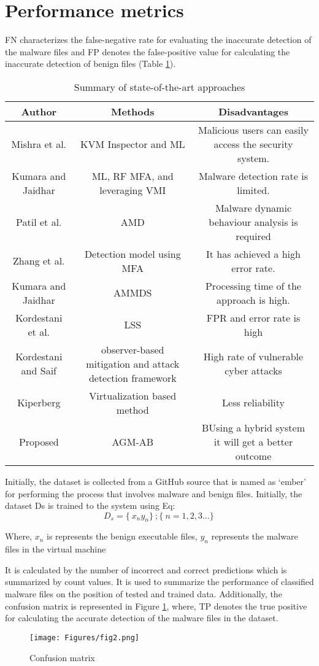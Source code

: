 \documentclass[acmtog]{acmart}
\begin{document}
\section {Performance metrics}
FN characterizes the false-negative rate for evaluating the inaccurate detection of the malware files and FP denotes the false-positive value for calculating the inaccurate detection of benign files (Table \ref{tab:freq1}).
\begin{table}
  \caption{Summary of state-of-the-art approaches}
  \label{tab:freq1}
  \begin{tabular}{ccc}
    \toprule
    Author&Methods&Disadvantages\\
    \midrule
        Mishra et al.&KVM Inspector and ML&Malicious users can easily access the security system.\\
    \midrule
        Kumara and Jaidhar&ML, RF MFA, and leveraging VMI&Malware detection rate is limited.\\
    \midrule
        Patil et al.&AMD&Malware dynamic behaviour analysis is required\\
    \midrule
        Zhang et al.&Detection model using MFA&It has achieved a high error rate.\\
    \midrule
        Kumara and Jaidhar&AMMDS&Processing time of the approach is high.\\
    \midrule
        Kordestani et al.&LSS&FPR and error rate is high\\
    \midrule
        Kordestani and Saif&observer-based mitigation and attack detection framework&High rate of vulnerable cyber attacks\\
    \midrule
        Kiperberg&Virtualization based method&Less reliability\\
    \midrule
        Proposed&AGM-AB&BUsing a hybrid system it will get a better outcome\\
  \bottomrule
\end{tabular}
\end{table}
\par Initially, the dataset is collected from a GitHub source that is named as ‘ember’ for performing the process that involves malware and benign files. Initially, the dataset Ds is trained to the system using Eq:
$$
D_s =  \{\ x_n y_n\}\ ; \{\ n = 1,2,3...\}\,
$$
\par Where, $x_n$ is represents the benign executable files, $y_n$ represents the malware files in the virtual machine
\par It is calculated by the number of incorrect and correct predictions which is summarized by count values. It is used to summarize the performance of classified malware files on the position of tested and trained data. Additionally, the confusion matrix is represented in Figure \ref{Figure 2:image}, where, TP denotes the true positive for calculating the accurate detection of the malware files in the dataset. 
\begin{figure}[h]
  \centering
  \texttt{[image: Figures/fig2.png]}
  \caption{Confusion matrix}
  \label{Figure 2:image}
\end{figure}
\end{document}
